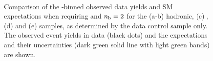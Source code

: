 \clearpage
\begin{figure}[t!]
  \begin{center}
     \\
    \caption{\label{fig:best-fit-control-only-ge4j2b} Comparison of the
      \scalht-binned observed data yields and SM expectations when
      requiring \njethigh and $n_{\text{b}} = 2$ for the (a-b) hadronic, (c)
      \mj, (d) \mmj and (e) \gj samples, as determined by the \mj data
      control sample only. The observed event yields in data (black
      dots) and the expectations and their uncertainties (dark green
      solid line with light green bands) are shown. }
  \end{center}
\end{figure}


